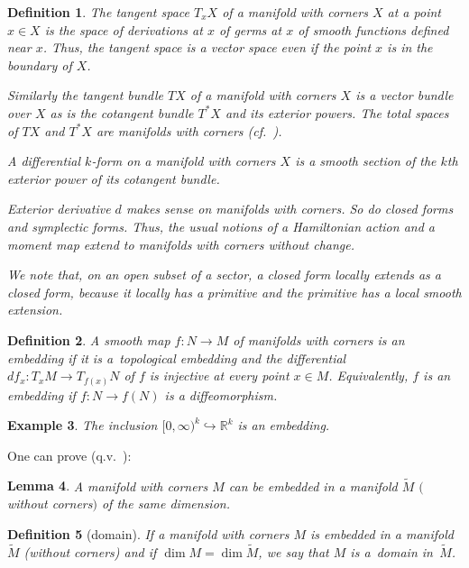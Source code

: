 \documentclass[pdftex]{sigma}
\numberwithin{equation}{section}
\newtheorem{Lemma}{Lemma}[section]
\newtheorem{Definition}[Lemma]{Definition}
\newtheorem{Example}[Lemma]{Example}
\begin{document}
\begin{Definition}\label{differential forms}
The \emph{tangent space} $T_xX$ of a manifold with corners $X$ at a
point $x\in X$ is the space of derivations at $x$ of germs at $x$ of
smooth functions def\/ined near $x$.  Thus, the tangent space is a
vector space even if the point $x$ is in the boundary of $X$.

Similarly the tangent bundle $TX$ of a manifold with corners $X$ is a
vector bundle over $X$ as is the cotangent bundle $T^*X$ and its
exterior powers. The total spaces of $TX$ and $T^*X$ are manifolds
with corners (cf.~\cite[p.~19]{Michor}).

A {\em differential $k$-form} on a manifold with corners $X$
is a smooth section of the $k$th exterior power of its cotangent bundle.

Exterior derivative $d$ makes sense on manifolds with corners.  So do
closed forms and symplectic forms.
Thus, the usual notions of a Hamiltonian action and a moment map
extend to manifolds with corners without change.

We note that, on an open subset of a sector,
a closed form locally extends as a \emph{closed} form, because
it locally has a primitive and the primitive has a local smooth extension.
\end{Definition}

\begin{Definition}\label{def:embedding}
  A smooth map $f\colon N\to M$ of manifolds with corners is an {\em
    embedding} if it is a~topological embedding and the dif\/ferential
  $df_x\colon T_xM\to T_{f(x)}N$ of $f$ is injective at every point $x\in M$.
  Equivalently, $f$ is an embedding if $f \colon N \to f(N)$
  is a dif\/feomorphism.
\end{Definition}

\begin{Example}
The inclusion $[0,\infty)^k \hookrightarrow {\mathbb R}^k$ is an embedding.
\end{Example}

One can prove (q.v.\ \cite[p.~21]{Michor}):
\begin{Lemma}\label{lem:domain}
  A manifold with corners $M$ can be embedded in a manifold
  $\tilde{M}$ $($without corners$)$ of the same dimension.
\end{Lemma}

\begin{Definition}[domain]\label{def:domain}
  If a manifold with corners $M$ is embedded in a manifold~$\tilde{M}$
  (without corners) and if $\dim M = \dim \tilde{M}$, we say that $M$ is
  a~{\em domain} in~$\tilde{M}$.
\end{Definition}
\end{document}
